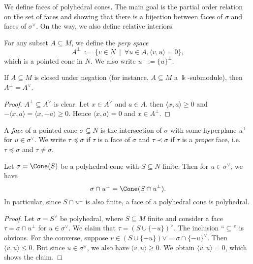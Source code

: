 We define faces of polyhedral cones. The main goal is the partial
order relation on the set of faces and showing that there is a
bijection between faces of \( \sigma \) and faces of \( \sigma^{\vee}
\). On the way, we also define relative interiors.

\begin{definition}
  \label{3-perp}
  \uses{}
  For any subset \( A \subseteq M \), we define the \emph{perp space}
  \[
      A^{\perp}\ :=\ \{v \in N\ \mid\ \forall u \in A, \langle v, u \rangle = 0\},
  \]
  which is a pointed cone in \( N \). We also write \( u^{\perp} :=
  \{u\}^{\perp} \).
\end{definition}

\begin{lemma}
  \label{3-perp-closed-negation}
  \uses{}
  If \( A \subseteq M \) is closed under negation (for instance, \( A
  \subseteq M \) a \( \Bbbk \)-submodule), then \( A^{\perp} =
  A^{\vee} \).
\end{lemma}
\begin{proof}
  \uses{}
  \( A^{\perp} \subseteq A^{\vee} \) is clear. Let \( x \in A^{\vee}
  \) and \( a \in A \). then \( \langle x, a \rangle \geq 0 \) and \(
  -\langle x, a \rangle = \langle x, -a \rangle \geq 0 \). Hence \(
  \langle x, a \rangle = 0 \) and \( x \in A^{\perp} \).
\end{proof}


\begin{definition}
  \label{3-face}
  A \emph{face} of a pointed cone \( \sigma \subseteq N \) is the
  intersection of \( \sigma \) with some hyperplane \( u^{\perp} \)
  for \( u \in \sigma^{\vee} \). We write \( \tau \preceq \sigma \) if
  \( \tau \) is a face of \( \sigma \) and \( \tau \prec \sigma \) if
  \( \tau \) is a \emph{proper} face, i.e. \( \tau \preceq \sigma \)
  and \( \tau \neq \sigma \).
\end{definition}

\begin{proposition}
  \label{3-face-polyhedral}
  Let \( \sigma = \Cone(S) \) be a polyhedral cone with \( S \subseteq
  N \) finite. Then for \( u \in \sigma^{\vee} \), we have
  \[
      \sigma \cap u^{\perp} = \Cone(S \cap u^{\perp}).
  \]
  In particular, since \( S \cap u^{\perp} \) is also finite, a face
  of a polyhedral cone is polyhedral.
\end{proposition}
\begin{proof}
    Let \( \sigma = S^{\vee} \) be polyhedral, where \( S \subseteq M
    \) finite and consider a face \( \tau = \sigma \cap u^{\perp} \)
    for \( u \in \sigma^{\vee} \). We claim that \( \tau = (S \cup
    \{-u\})^\vee \). The inclusion ``\( \subseteq \)'' is obvious. For
    the converse, suppose \( v \in (S \cup \{-u\})\vee = \sigma \cap
    \{-u\}^\vee \). Then \( \langle v, u \rangle \leq 0 \). But since
    \( u \in \sigma^{\vee} \), we also have \( \langle v, u \rangle
    \geq 0 \). We obtain \( \langle v, u \rangle = 0 \), which shows
    the claim.
\end{proof}

